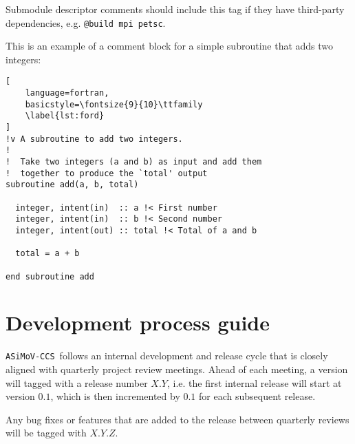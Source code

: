 \documentclass[11pt]{report}
\newcommand{\accs}{\texttt{ASiMoV-CCS}}
\begin{document}
Submodule descriptor comments should include this tag if they have third-party dependencies, e.g. \texttt{@build mpi petsc}.


This is an example of a comment block for a simple subroutine that adds two integers:

\begin{lstlisting}[
	language=fortran,
    basicstyle=\fontsize{9}{10}\ttfamily
    \label{lst:ford}
]
!v A subroutine to add two integers.
!
!  Take two integers (a and b) as input and add them
!  together to produce the `total' output
subroutine add(a, b, total)

  integer, intent(in)  :: a !< First number
  integer, intent(in)  :: b !< Second number
  integer, intent(out) :: total !< Total of a and b

  total = a + b

end subroutine add
\end{lstlisting}


\chapter{Development process guide}
\accs\ follows an internal development and release cycle that is closely aligned with quarterly project review meetings. Ahead of 
each meeting, a version will tagged with a release number $X.Y$, i.e. the first internal release will start at version $0.1$, which 
is then incremented by $0.1$ for each subsequent release. 

Any bug fixes or features that are added to the release between quarterly reviews will be tagged with $X.Y.Z$.
\end{document}
